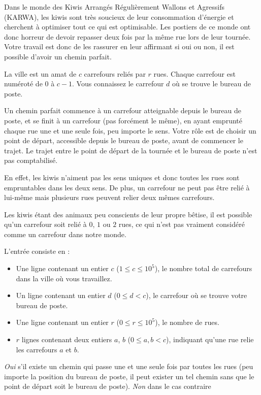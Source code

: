 

Dans le monde des Kiwis Arrangés Régulièrement Wallons et Agressifs (KARWA), les kiwis sont très soucieux de leur consommation d'énergie et cherchent à optimiser tout ce qui est optimisable. Les postiers de ce monde ont donc horreur de devoir repasser deux fois par la même rue lors de leur tournée. Votre travail est donc de les rassurer en leur affirmant si oui ou non, il est possible d'avoir un chemin parfait.

La ville est un amat de $c$ carrefours reliés par $r$ rues. Chaque carrefour est numéroté de $0$ à $c-1$. Vous connaissez le carrefour $d$ où se trouve le bureau de poste.

Un chemin parfait commence à un carrefour atteignable depuis le bureau de poste, et se finit à un carrefour (pas forcément le même), en ayant emprunté chaque rue une et une seule fois, peu importe le sens. Votre rôle est de choisir un point de départ, accessible depuis le bureau de poste, avant de commencer le trajet. Le trajet entre le point de départ de la tournée et le bureau de poste n'est pas comptabilisé.

En effet, les kiwis n'aiment pas les sens uniques et donc toutes les rues sont empruntables dans les deux sens. De plus, un carrefour ne peut pas être relié à lui-même mais plusieurs rues peuvent relier deux mêmes carrefours.

Les kiwis étant des animaux peu conscients de leur propre bêtise, il est possible qu'un carrefour soit relié à $0$, $1$ ou $2$ rues, ce qui n'est pas vraiment considéré comme un carrefour dans notre monde.

\begin{Input}
    L'entrée consiste en :
    \begin{itemize}
        \item Une ligne contenant un entier $c$ ($1 \leq c \leq 10^5$), le nombre total de carrefours dans la ville où vous travaillez.
        \item Un ligne contenant un entier $d$ ($0 \leq d < c$), le carrefour où se trouve votre bureau de poste.
        \item Une ligne contenant un entier $r$ ($0 \leq r \leq 10^5$), le nombre de rues.
        \item $r$ lignes contenant deux entiers $a$, $b$ ($0 \leq a,b < c$), indiquant qu'une rue relie les carrefours $a$ et $b$.
    \end{itemize}
\end{Input}

\begin{Output}
    \emph{Oui} s'il existe un chemin qui passe une et une seule fois par toutes les rues (peu importe la position du bureau de poste, il peut exister un tel chemin sans que le point de départ soit le bureau de poste). \emph{Non} dans le cas contraire
\end{Output}
